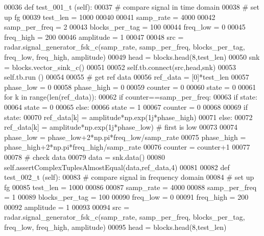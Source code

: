 \begin{DoxyCode}
00036     \textcolor{keyword}{def }test_001_t (self):
00037         \textcolor{comment}{# compare signal in time domain}
00038         \textcolor{comment}{# set up fg}
00039         test\_len = 1000
00040         
00041         samp\_rate = 4000
00042         samp\_per\_freq = 2
00043         blocks\_per\_tag = 100
00044         freq\_low = 0
00045         freq\_high = 200
00046         amplitude = 1
00047         
00048         src = radar.signal\_generator\_fsk\_c(samp\_rate, samp\_per\_freq, blocks\_per\_tag, freq\_low, freq\_high, 
      amplitude)
00049         head = blocks.head(8,test\_len)
00050         snk = blocks.vector\_sink\_c()
00051         
00052         self.tb.connect(src,head,snk)
00053         self.tb.run ()
00054         
00055         \textcolor{comment}{# get ref data}
00056         ref\_data = [0]*test\_len
00057         phase\_low = 0
00058         phase\_high = 0
00059         counter = 0
00060         state = 0
00061         \textcolor{keywordflow}{for} k \textcolor{keywordflow}{in} range(len(ref\_data)):
00062             \textcolor{keywordflow}{if} counter==samp\_per\_freq:
00063                 \textcolor{keywordflow}{if} state:
00064                     state = 0
00065                 \textcolor{keywordflow}{else}:
00066                     state = 1
00067                 counter = 0
00068             
00069             \textcolor{keywordflow}{if} state:
00070                 ref\_data[k] = amplitude*np.exp(1j*phase\_high)
00071             \textcolor{keywordflow}{else}:
00072                 ref\_data[k] = amplitude*np.exp(1j*phase\_low) \textcolor{comment}{# first is low}
00073                 
00074             phase\_low = phase\_low+2*np.pi*freq\_low/samp\_rate
00075             phase\_high = phase\_high+2*np.pi*freq\_high/samp\_rate
00076             counter = counter+1
00077         
00078         \textcolor{comment}{# check data}
00079         data = snk.data()
00080         self.assertComplexTuplesAlmostEqual(data,ref\_data,4)
00081         
00082     \textcolor{keyword}{def }test_002_t (self):
00083         \textcolor{comment}{# compare signal in frequency domain}
00084         \textcolor{comment}{# set up fg}
00085         test\_len = 1000
00086         
00087         samp\_rate = 4000
00088         samp\_per\_freq = 1
00089         blocks\_per\_tag = 100
00090         freq\_low = 0
00091         freq\_high = 200
00092         amplitude = 1
00093         
00094         src = radar.signal\_generator\_fsk\_c(samp\_rate, samp\_per\_freq, blocks\_per\_tag, freq\_low, freq\_high, 
      amplitude)
00095         head = blocks.head(8,test\_len)

\end{DoxyCode}
